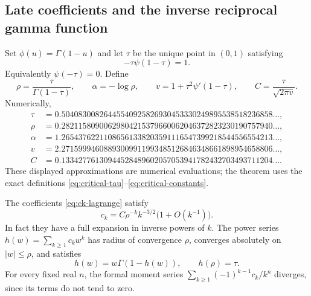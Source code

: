 \subsection{Late coefficients and the inverse reciprocal gamma function}
Set $\phi(u)=\Gamma(1-u)$ and let $\tau$ be the unique point in $(0,1)$
satisfying
\begin{equation}
 -\tau\psi(1-\tau)=1.
 \label{eq:critical-tau}
\end{equation}
Equivalently $\psi(-\tau)=0$.  Define
\begin{equation}
 \rho=\frac{\tau}{\Gamma(1-\tau)},\qquad
 \alpha=-\log\rho,\qquad
 v=1+\tau^2\psi'(1-\tau),\qquad
 C=\frac{\tau}{\sqrt{2\pi v}}.
 \label{eq:critical-constants}
\end{equation}
Numerically,
\begin{align*}
 \tau&=0.50408300826445540925826930453330249895538518236858\ldots,\\
 \rho&=0.28211580900629804215379660062046372823230190757940\ldots,\\
 \alpha&=1.26543762211086561338203591116547399218544556554213\ldots,\\
 v&=2.27159994608893009911993485126846348661898954658806\ldots,\\
 C&=0.13342776130944528489602057053941782432703493711204\ldots.
\end{align*}
These displayed approximations are numerical evaluations; the theorem uses
the exact definitions \eqref{eq:critical-tau}--\eqref{eq:critical-constants}.

\begin{theorem}
\label{thm:late-coefficients}
The coefficients \eqref{eq:ck-lagrange} satisfy
\begin{equation}
 c_k=C\rho^{-k}k^{-3/2}\bigl(1+O(k^{-1})\bigr).
 \label{eq:ck-asymptotic}
\end{equation}
In fact they have a full expansion in inverse powers of $k$.
The power series $h(w)=\sum_{k\ge1}c_kw^k$ has radius of convergence
$\rho$, converges absolutely on $|w|\le\rho$, and satisfies
\[
 h(w)=w\Gamma(1-h(w)),\qquad h(\rho)=\tau.
\]
For every fixed real $n$, the formal moment series
$\sum_{k\ge1}(-1)^{k-1}c_k/k^n$ diverges, since its terms do not tend to zero.
\end{theorem}

